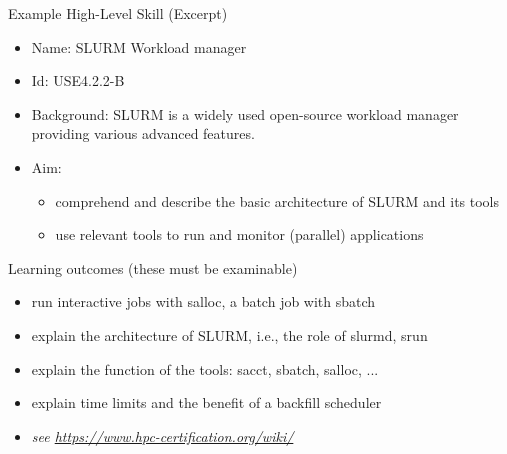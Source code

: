 \documentclass[compress,aspectratio=169]{beamer}
\begin{document}
\begin{frame}{Example High-Level Skill (Excerpt)}
\begin{itemize}
\item Name: SLURM Workload manager
\item Id: USE4.2.2-B
\item Background: {\small SLURM is a widely used open-source workload
manager providing various advanced features.}
\item Aim:
\begin{itemize}
\item comprehend and describe the basic architecture of SLURM and its tools
\item use relevant tools to run and monitor (parallel) applications
\end{itemize}
\end{itemize}

\begin{block}{Learning outcomes (these must be examinable)}
\begin{itemize}
\item run interactive jobs with salloc, a batch job with sbatch
\item explain the architecture of SLURM, i.e., the role of slurmd, srun
\item explain the function of the tools: sacct, sbatch, salloc, ...
\item explain time limits and the benefit of a backfill scheduler
\item \textit{see \url{https://www.hpc-certification.org/wiki/}}
\end{itemize}
\end{block}
\end{frame}
\end{document}
